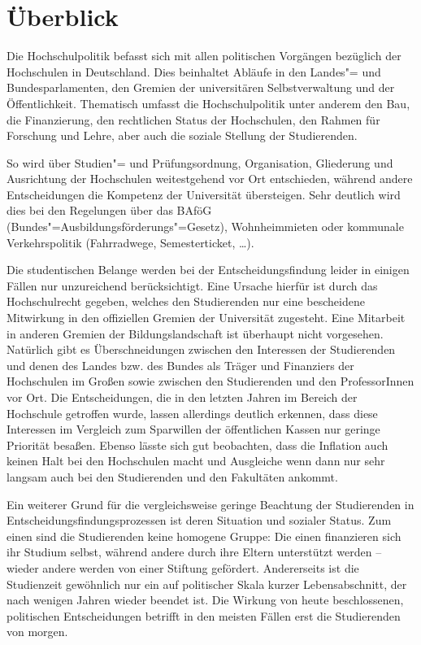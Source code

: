 \section{Überblick}
\label{hopo}

Die Hochschulpolitik befasst sich mit allen politischen Vorgängen bezüglich der
Hochschulen in Deutschland. Dies beinhaltet Abläufe in den Landes"= und
Bundesparlamenten, den Gremien der universitären Selbstverwaltung und der
Öffentlichkeit. Thematisch umfasst die Hochschulpolitik unter anderem den Bau,
die Finanzierung, den rechtlichen Status der Hochschulen, den Rahmen für
Forschung und Lehre, aber auch die soziale Stellung der Studierenden.

So wird über Studien"= und Prüfungsordnung, Organisation, Gliederung und
Ausrichtung der Hochschulen weitestgehend vor Ort entschieden, während andere
Entscheidungen die Kompetenz der Universität übersteigen. Sehr deutlich wird
dies bei den Regelungen über das BAföG (Bundes"=Ausbildungsförderungs"=Gesetz),
Wohnheimmieten oder kommunale Verkehrspolitik (Fahrradwege, Semesterticket,
\dots).

Die studentischen Belange werden bei der Entscheidungsfindung leider in einigen
Fällen nur unzureichend berücksichtigt. Eine Ursache hierfür ist durch das
Hochschulrecht gegeben, welches den Studierenden nur eine bescheidene
Mitwirkung in den offiziellen Gremien der Universität zugesteht. Eine Mitarbeit
in anderen Gremien der Bildungslandschaft ist überhaupt nicht vorgesehen.
Natürlich gibt es Überschneidungen zwischen den Interessen der Studierenden und
denen des Landes bzw. des Bundes als Träger und Finanziers der Hochschulen im
Großen sowie zwischen den Studierenden und den ProfessorInnen vor Ort. Die
Entscheidungen, die in den letzten Jahren im Bereich der Hochschule getroffen
wurde, lassen allerdings deutlich erkennen, dass diese Interessen im Vergleich
zum Sparwillen der öffentlichen Kassen nur geringe Priorität besaßen. Ebenso
lässte sich gut beobachten, dass die Inflation auch keinen Halt bei den
Hochschulen macht und Ausgleiche wenn dann nur sehr langsam auch bei den
Studierenden und den Fakultäten ankommt.

Ein weiterer Grund für die vergleichsweise geringe Beachtung der Studierenden
in Entscheidungsfindungsprozessen ist deren Situation und sozialer Status. Zum
einen sind die Studierenden keine homogene Gruppe: Die einen finanzieren sich
ihr Studium selbst, während andere durch ihre Eltern unterstützt werden --
wieder andere werden von einer Stiftung gefördert. Andererseits ist die
Studienzeit gewöhnlich nur ein auf politischer Skala kurzer Lebensabschnitt,
der nach wenigen Jahren wieder beendet ist. Die Wirkung von heute
beschlossenen, politischen Entscheidungen betrifft in den meisten Fällen erst
die Studierenden von morgen.


